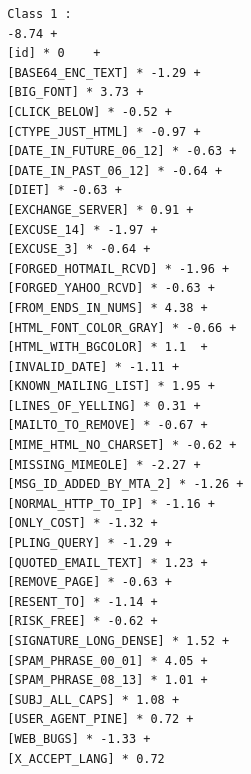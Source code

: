 {\begin{multicols}{2}
\begin{verbatim}
		Class 1 :
		-8.74 + 
		[id] * 0    +
		[BASE64_ENC_TEXT] * -1.29 +
		[BIG_FONT] * 3.73 +
		[CLICK_BELOW] * -0.52 +
		[CTYPE_JUST_HTML] * -0.97 +
		[DATE_IN_FUTURE_06_12] * -0.63 +
		[DATE_IN_PAST_06_12] * -0.64 +
		[DIET] * -0.63 +
		[EXCHANGE_SERVER] * 0.91 +
		[EXCUSE_14] * -1.97 +
		[EXCUSE_3] * -0.64 +
		[FORGED_HOTMAIL_RCVD] * -1.96 +
		[FORGED_YAHOO_RCVD] * -0.63 +
		[FROM_ENDS_IN_NUMS] * 4.38 +
		[HTML_FONT_COLOR_GRAY] * -0.66 +
		[HTML_WITH_BGCOLOR] * 1.1  +
		[INVALID_DATE] * -1.11 +
		[KNOWN_MAILING_LIST] * 1.95 +
		[LINES_OF_YELLING] * 0.31 +
		[MAILTO_TO_REMOVE] * -0.67 +
		[MIME_HTML_NO_CHARSET] * -0.62 +
		[MISSING_MIMEOLE] * -2.27 +
		[MSG_ID_ADDED_BY_MTA_2] * -1.26 +
		[NORMAL_HTTP_TO_IP] * -1.16 +
		[ONLY_COST] * -1.32 +
		[PLING_QUERY] * -1.29 +
		[QUOTED_EMAIL_TEXT] * 1.23 +
		[REMOVE_PAGE] * -0.63 +
		[RESENT_TO] * -1.14 +
		[RISK_FREE] * -0.62 +
		[SIGNATURE_LONG_DENSE] * 1.52 +
		[SPAM_PHRASE_00_01] * 4.05 +
		[SPAM_PHRASE_08_13] * 1.01 +
		[SUBJ_ALL_CAPS] * 1.08 +
		[USER_AGENT_PINE] * 0.72 +
		[WEB_BUGS] * -1.33 +
		[X_ACCEPT_LANG] * 0.72
	\end{verbatim}
\end{multicols}
}
